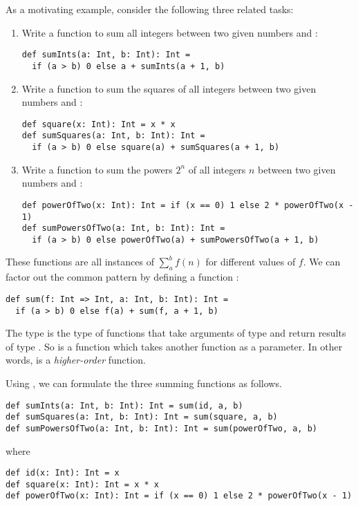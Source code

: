As a motivating example, consider the following three related tasks:
\begin{enumerate}
\item
Write a function to sum all integers between two given numbers  and :
\begin{lstlisting}
def sumInts(a: Int, b: Int): Int =
  if (a > b) 0 else a + sumInts(a + 1, b)
\end{lstlisting}
\item 
Write a function to sum the squares of all integers between two given numbers 
 and :
\begin{lstlisting}
def square(x: Int): Int = x * x
def sumSquares(a: Int, b: Int): Int =
  if (a > b) 0 else square(a) + sumSquares(a + 1, b)
\end{lstlisting}
\item
Write a function to sum the powers $2^n$ of all integers $n$ between
two given numbers  and :
\begin{lstlisting}
def powerOfTwo(x: Int): Int = if (x == 0) 1 else 2 * powerOfTwo(x - 1)
def sumPowersOfTwo(a: Int, b: Int): Int =
  if (a > b) 0 else powerOfTwo(a) + sumPowersOfTwo(a + 1, b)
\end{lstlisting}
\end{enumerate}
These functions are all instances of
\(\sum^b_a f(n)\) for different values of $f$. 
We can factor out the common pattern by defining a function :
\begin{lstlisting}
def sum(f: Int => Int, a: Int, b: Int): Int =
  if (a > b) 0 else f(a) + sum(f, a + 1, b)
\end{lstlisting}
The type  is the type of functions that
take arguments of type  and return results of type
. So  is a function which takes another function as
a parameter. In other words,  is a {\em higher-order}
function.

Using , we can formulate the three summing functions as
follows.
\begin{lstlisting}
def sumInts(a: Int, b: Int): Int = sum(id, a, b)
def sumSquares(a: Int, b: Int): Int = sum(square, a, b)
def sumPowersOfTwo(a: Int, b: Int): Int = sum(powerOfTwo, a, b)
\end{lstlisting}
where
\begin{lstlisting}
def id(x: Int): Int = x
def square(x: Int): Int = x * x
def powerOfTwo(x: Int): Int = if (x == 0) 1 else 2 * powerOfTwo(x - 1)
\end{lstlisting}

